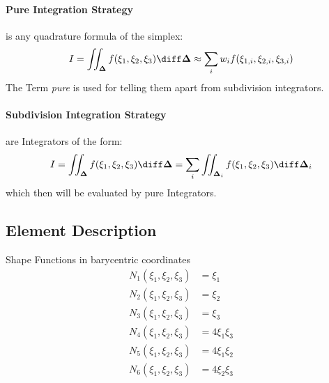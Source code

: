 \documentclass{mitschrift}
\newcommand{\simplex}{\boldsymbol{\Delta}}
\begin{document}
\paragraph{Pure Integration Strategy} is any quadrature formula of the simplex: \begin{equation}
    I = \iint_{\simplex} f(\xi_1, \xi_2, \xi_3) \diff \simplex \approx \sum_{i} w_i f(\xi_{1,i}, \xi_{2,i}, \xi_{3,i})
\end{equation} The Term \emph{pure} is used for telling them apart from subdivision integrators.

\paragraph{Subdivision Integration Strategy} are Integrators of the form: \begin{equation}
    I = \iint_{\simplex} f(\xi_1, \xi_2, \xi_3) \diff \simplex = \sum_{i} \iint_{\simplex_i} f(\xi_1, \xi_2, \xi_3) \diff \simplex_i
\end{equation} which then will be evaluated by pure Integrators.

\subsection{Element Description}

\begin{marginfigure}
    \centering
\end{marginfigure}

Shape Functions in barycentric coordinates \begin{align}
    N_1(\xi_1,\xi_2,\xi_3) &= \xi_1 \\
    N_2(\xi_1,\xi_2,\xi_3) &= \xi_2 \\
    N_3(\xi_1,\xi_2,\xi_3) &= \xi_3 \\
    N_4(\xi_1,\xi_2,\xi_3) &= 4 \xi_1\xi_3 \\
    N_5(\xi_1,\xi_2,\xi_3) &= 4 \xi_1\xi_2 \\
    N_6(\xi_1,\xi_2,\xi_3) &= 4 \xi_2\xi_3
\end{align}
\end{document}
